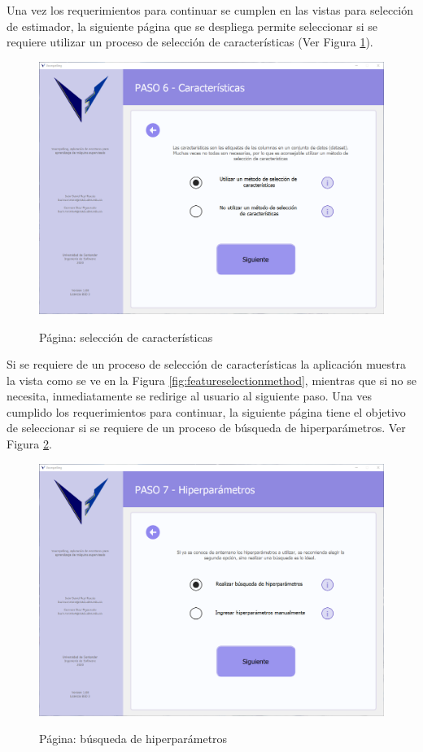 Una vez los requerimientos para continuar se cumplen en las vistas para selección de estimador, la siguiente página que se despliega permite seleccionar si se requiere utilizar un proceso de selección de características (Ver Figura \ref{fig:wantfeatureselection}).

\begin{figure}[H]
    \centering
    \caption{Página: selección de características}
    \includegraphics[width=\textwidth]{views/want_feature_selection.png}
    \label{fig:wantfeatureselection}
\end{figure}

Si se requiere de un proceso de selección de características la aplicación muestra la vista como se ve en la Figura \ref{fig:featureselectionmethod}, mientras que si no se necesita, inmediatamente se redirige al usuario al siguiente paso. Una ves cumplido los requerimientos para continuar, la siguiente página tiene el objetivo de seleccionar si se requiere de un proceso de búsqueda de hiperparámetros. Ver Figura \ref{fig:wanthiperparametersearch}.

\begin{figure}[H]
    \centering
    \caption{Página: búsqueda de hiperparámetros}
    \includegraphics[width=\textwidth]{views/want_hiperparameter_search.png}
    \label{fig:wanthiperparametersearch}
\end{figure}

